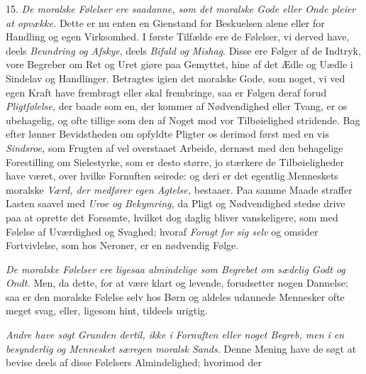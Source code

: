 \documentclass[12pt,a4paper]{article}
\newcommand{\opage}[1]{\marginnote{\footnotesize\textit{[#1]}}}
\begin{document}
15. \emph{De moralske Følelser ere saadanne, som det moralske Gode eller Onde pleier at
opvække.} Dette er nu enten en Gienstand for Beskuelsen alene eller for Handling og egen
Virksomhed. I første Tilfælde ere de Følelser, vi derved have, deels \emph{Beundring og
Afskye}, deels \emph{Bifald og Mishag}. Disse ere Følger af de Indtryk, vore Begreber om
Ret og Uret giøre paa Gemyttet, hine af det Ædle og Uædle i Sindelav og Handlinger.
Betragtes igien det moralske Gode, som noget, vi ved egen Kraft have frembragt eller skal
frembringe, saa er Følgen deraf forud
\opage{261} \emph{Pligtfølelse,} der baade som en, der kommer af Nødvendighed eller Tvang, er os
ubehagelig, og ofte tillige som den af Noget mod vor Tilbøielighed stridende. Bag efter
lønner Bevidstheden om opfyldte Pligter os derimod først med en vis \emph{Sindsroe,} som
Frugten af vel overstaaet Arbeide, dernæst med den behagelige Forestilling om Sielestyrke,
som er desto større, jo stærkere de Tilbøieligheder have været, over hvilke Fornuften
seirede: og deri er det egentlig Menneskets moralske \emph{Værd, der medfører egen
Agtelse,} bestaaer. Paa samme Maade straffer Lasten saavel med \emph{Uroe og Bekymring,} da
Pligt og Nødvendighed stedse drive paa at oprette det Forsømte, hvilket dog daglig bliver
vanskeligere, som med Følelse af Uværdighed og Svaghed; hvoraf \emph{Foragt for sig selv}
og omsider Fortvivlelse, som hos Neroner, er en nødvendig Følge.

\emph{De moralske Følelser ere ligesaa almindelige som Begrebet om sædelig Godt og Ondt.}
Men, da dette, for at være klart og levende, forudsetter nogen Dannelse; saa er den moralske
Følelse selv hos Børn og aldeles udannede Mennesker ofte meget svag, eller, ligesom hint,
tildeels urigtig.

\emph{Andre have søgt Grunden dertil, ikke i Fornuften eller noget Begreb, men i en
besynderlig og Mennesket særegen moralsk Sands.} Denne Mening have de søgt at bevise deels
af disse Følelsers Almindelighed; hvorimod der

\end{document}
